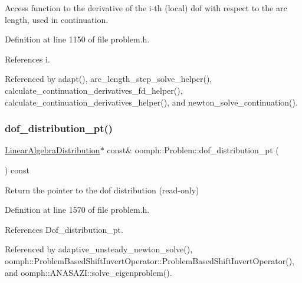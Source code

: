 Access function to the derivative of the i-\/th (local) dof with respect to the arc length, used in continuation. 



Definition at line 1150 of file problem.\+h.



References i.



Referenced by adapt(), arc\+\_\+length\+\_\+step\+\_\+solve\+\_\+helper(), calculate\+\_\+continuation\+\_\+derivatives\+\_\+fd\+\_\+helper(), calculate\+\_\+continuation\+\_\+derivatives\+\_\+helper(), and newton\+\_\+solve\+\_\+continuation().

\mbox{\label{classoomph_1_1Problem_a17a5a4886c4213422179fe8346336a4e}} 
\subsubsection{\texorpdfstring{dof\+\_\+distribution\+\_\+pt()}{dof\_distribution\_pt()}}
{\footnotesize\ttfamily \hyperlink{classoomph_1_1LinearAlgebraDistribution}{Linear\+Algebra\+Distribution}$\ast$ const\& oomph\+::\+Problem\+::dof\+\_\+distribution\+\_\+pt (\begin{DoxyParamCaption}{ }\end{DoxyParamCaption}) const\hspace{0.3cm}{\ttfamily [inline]}}



Return the pointer to the dof distribution (read-\/only) 



Definition at line 1570 of file problem.\+h.



References Dof\+\_\+distribution\+\_\+pt.



Referenced by adaptive\+\_\+unsteady\+\_\+newton\+\_\+solve(), oomph\+::\+Problem\+Based\+Shift\+Invert\+Operator\+::\+Problem\+Based\+Shift\+Invert\+Operator(), and oomph\+::\+A\+N\+A\+S\+A\+Z\+I\+::solve\+\_\+eigenproblem().

\mbox{\label{classoomph_1_1Problem_a9b6926d906bedf6adfeed6872d3fd3a8}} 
